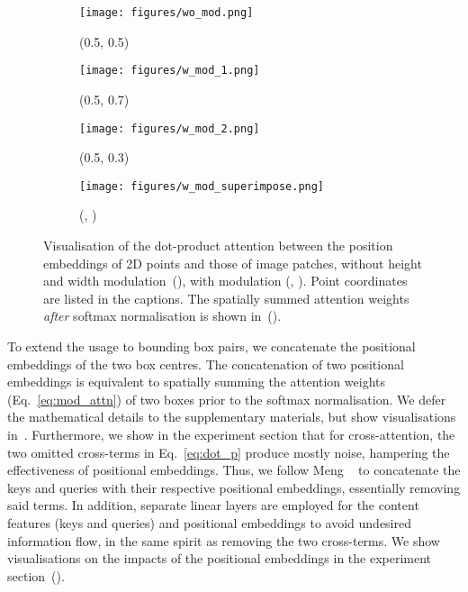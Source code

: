 \documentclass[10pt,twocolumn,letterpaper]{article}
\begin{document}
\begin{figure}[t]
   \begin{subfigure}[t]{.24\linewidth}
      \centering
      \texttt{[image: figures/wo\_mod.png]}
      \caption{(0.5, 0.5)}
      \label{fig:mod_attn_1}
   \end{subfigure}
   \hfill
   \begin{subfigure}[t]{.24\linewidth}
      \centering
      \texttt{[image: figures/w\_mod\_1.png]}
      \caption{(0.5, 0.7)}
      \label{fig:mod_attn_2}
   \end{subfigure}
   \hfill
   \begin{subfigure}[t]{.24\linewidth}
      \centering
      \texttt{[image: figures/w\_mod\_2.png]}
      \caption{(0.5, 0.3)}
      \label{fig:mod_attn_3}
   \end{subfigure}
   \hfill
   \begin{subfigure}[t]{.24\linewidth}
      \centering
      \texttt{[image: figures/w\_mod\_superimpose.png]}
      \caption{(, )}
      \label{fig:mod_attn_4}
   \end{subfigure}
   \vspace{5px}
   \caption{Visualisation of the dot-product attention between the position embeddings of 2D points and those of image patches, without height and width modulation~(), with modulation (, ). Point coordinates are listed in the captions. The spatially summed attention weights \textit{after} softmax normalisation is shown in~().}
   \label{fig:mod_attn}
\end{figure}

To extend the usage to bounding box pairs, we concatenate the positional embeddings of the two box centres. The concatenation of two positional embeddings is equivalent to spatially summing the attention weights (Eq.~\ref{eq:mod_attn}) of two boxes prior to the softmax normalisation. We defer the mathematical details to the supplementary materials, but show visualisations in~. Furthermore, we show in the experiment section that for cross-attention, the two omitted cross-terms in Eq.~\ref{eq:dot_p} produce mostly noise, hampering the effectiveness of positional embeddings. Thus, we follow Meng \etal~\cite{cond-detr} to concatenate the keys and queries with their respective positional embeddings, essentially removing said terms. In addition, separate linear layers are employed for the content features (keys and queries) and positional embeddings to avoid undesired information flow, in the same spirit as removing the two cross-terms. We show visualisations on the impacts of the positional embeddings in the experiment section~().
\end{document}
